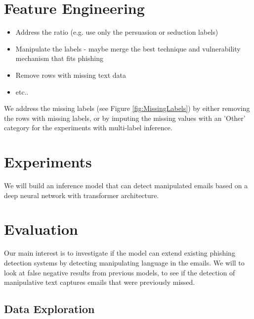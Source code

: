 \documentclass[
	letterpaper, %
	12pt, %
	unnumberedsections, %
	twoside, %
]{LTJournalArticle}
\begin{document}
\section{Feature Engineering}\label{sec:FeatureEngineering}


\begin{itemize}
	\item Address the ratio (e.g. use only the persuasion or seduction labels)
	\item Manipulate the labels - maybe merge the best technique and vulnerability mechanism that fits phishing
	\item Remove rows with missing text data
	\item etc..
\end{itemize}

We address the missing labels (see Figure \ref{fig:MissingLabels}) by either removing the rows with missing labels, or by imputing the missing values with an 'Other' category for the experiments with multi-label inference.




\section{Experiments}
We will build an inference model that can detect manipulated emails based on a deep neural network with transformer architecture.

\section{Evaluation}
Our main interest is to investigate if the model can extend existing phishing detection systems by detecting manipulating language in the emails. We will to look at false negative results from previous models, to see if the detection of manipulative text captures emails that were previously missed.








\clearpage
\printbibliography %



\begin{appendices}
	\onecolumn
	\section{Data Exploration}\label{appendix:DataExploration}
\end{appendices}
%
\end{document}
